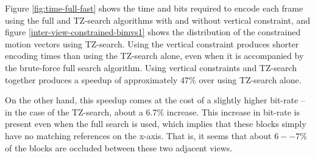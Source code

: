 \documentclass{sig-alternate-05-2015}
\begin{document}
Figure \ref{fig:time-full-fast} shows the time and bits required to encode each
frame using the full and TZ-search algorithms with and without vertical
constraint, and figure \ref{inter-view-constrained-bimvs1} shows the
distribution of the constrained motion vectors using TZ-search. Using the
vertical constraint produces shorter encoding times than using the TZ-search
alone, even when it is accompanied by the brute-force full search algorithm.
Using vertical constraints and TZ-search together produces a speedup of
approximately $47\%$ over using TZ-search alone.

On the other hand, this speedup comes at the cost of a slightly higher bit-rate
-- in the case of the TZ-search, about a $6.7\%$ increase. This increase in
bit-rate is present even when the full search is used, which implies that these
blocks simply have no matching references on the x-axis. That is, it seems that
about $6--7\%$ of the blocks are occluded between these two adjacent views.
\end{document}
